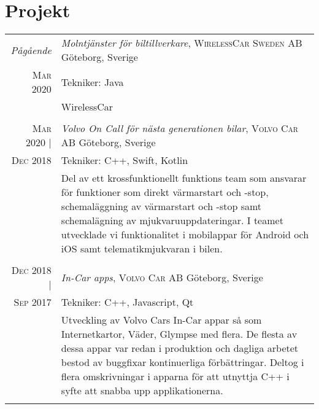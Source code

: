 \documentclass[a4paper,10pt]{scrartcl} %
\begin{document}

\section{Projekt}
\begin{tabular}{r|p{15cm}}


\emph{Pågående} 	                & \emph{Molntjänster för biltillverkare}, \textsc{WirelessCar Sweden AB} \hfill Göteborg, Sverige \\
\textsc{Mar 2020}                   & \footnotesize{Tekniker: Java} \\
\phantom{abcdefghijklm}             & \footnotesize{WirelessCar }\\
\multicolumn{2}{c}{} \\


\textsc{Mar 2020} |                 & \emph{Volvo On Call för nästa generationen bilar}, \textsc{Volvo Car AB} \hfill Göteborg, Sverige \\
\textsc{Dec 2018}                   & \footnotesize{Tekniker: C++, Swift, Kotlin} \\
\phantom{abcdefghijklm}             & \footnotesize{Del av ett krossfunktionellt funktions team som ansvarar för funktioner som direkt värmarstart och -stop, schemaläggning av värmarstart och -stop samt schemalägning av mjukvaruuppdateringar. I teamet utvecklade vi funktionalitet i mobilappar för Android och iOS samt telematikmjukvaran i bilen. }\\
\multicolumn{2}{c}{} \\


\textsc{Dec 2018} | 	            & \emph{In-Car apps}, \textsc{Volvo Car AB} \hfill Göteborg, Sverige \\
\textsc{Sep 2017}                   & \footnotesize{Tekniker: C++, Javascript, Qt} \\
\phantom{abcdefghijklm}             & \footnotesize{Utveckling av Volvo Cars In-Car appar så som Internetkartor, Väder, Glympse med flera. De flesta av dessa appar var redan i produktion och dagliga arbetet bestod av buggfixar kontinuerliga förbättringar. Deltog i flera omskrivningar i apparna för att utnyttja C++ i syfte att snabba upp applikationerna.}\\
\multicolumn{2}{c}{} \\


\end{tabular}
\end{document}
